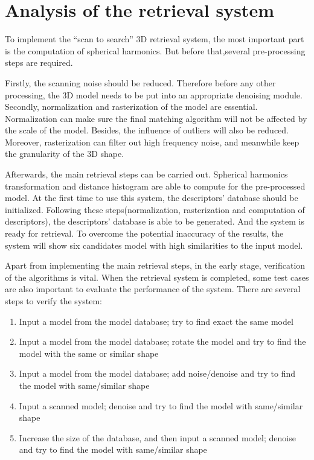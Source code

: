 \section{Analysis of the retrieval system}

To implement the ``scan to search'' 3D retrieval system, the most important part is the computation of spherical harmonics. But before that,several pre-processing steps are required. 

Firstly, the scanning noise should be reduced. Therefore before any other processing, the 3D model needs to be put into an appropriate denoising module. Secondly, normalization and rasterization of the model are essential. Normalization can make sure the final matching algorithm will not be affected by the scale of the model. Besides, the influence of outliers will also be reduced. Moreover, rasterization can filter out high frequency noise, and meanwhile keep the granularity of the 3D shape. 

Afterwards, the main retrieval steps can be carried out. Spherical harmonics transformation and distance histogram are able to compute for the pre-processed model. At the first time to use this system, the descriptors' database should be initialized. Following these steps(normalization, rasterization and computation of descriptors), the descriptors' database is able to be generated. And the system is ready for retrieval. To overcome the potential inaccuracy of the results, the system will show six candidates model with high similarities to the input model.

Apart from implementing the main retrieval steps, in the early stage, verification of the algorithms is vital. When the retrieval system is completed, some test cases are also important to evaluate the performance of the system. There are several steps to verify the system: 

\begin{enumerate}[1.]
\item Input a model from the model database; try to find exact the same model
\item Input a model from the model database; rotate the model and try to find the model with the same or similar shape
\item Input a model from the model database; add noise/denoise and try to find the model with same/similar shape
\item Input a scanned model; denoise and try to find the model with same/similar shape
\item Increase the size of the database, and then input a scanned model; denoise and try to find the model with same/similar shape
\end{enumerate}

